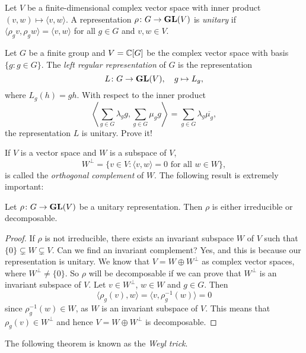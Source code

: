 \begin{definition}
    Let $V$ be a finite-dimensional complex vector space with inner product $(v,w)\mapsto\langle v,w\rangle$. 
    A representation $\rho\colon G\to\mathbf{GL}(V)$ is \emph{unitary} if
    $\langle \rho_gv,\rho_gw\rangle=\langle v,w\rangle$ for all $g\in G$ and $v,w\in V$.
\end{definition}

\begin{exercise}
Let $G$ be a finite group and $V=\mathbb{C}[G]$ be the complex vector space with basis
$\{g:g\in G\}$. The \emph{left regular representation}
of $G$ is the representation
\[
L\colon G\to\mathbf{GL}(V),
\quad
g\mapsto L_g,
\]
where $L_g(h)=gh$. With respect to the inner product
\[
\left\langle\sum_{g\in G}\lambda_gg,\sum_{g\in G}\mu_gg\right\rangle=\sum_{g\in G}\lambda_g\overline{\mu_g},
\]
the representation $L$ is unitary. Prove it! 
\end{exercise}



If $V$ is a vector space and $W$ is a subspace of $V$, 
\[
W^\perp = \{v\in V:\langle v,w\rangle=0\text{ for all $w\in W$}\}, 
\]
is called the 
\emph{orthogonal complement} of $W$. The following result is extremely important: 

\begin{proposition}
\label{pro:irr_or_dec}
Let $\rho\colon G\to\mathbf{GL}(V)$ be a unitary representation. Then $\rho$ is either
irreducible or decomposable.
\end{proposition}

\begin{proof}
	If $\rho$ is not irreducible, there exists an invariant subspace $W$ of $V$ such that
	$\{0\}\subsetneq W\subsetneq V$. Can we find an invariant complement? Yes, and this is because 
        our representation is unitary.  
	We know that $V=W\oplus W^{\perp}$ as complex vector spaces, where 
	$W^\perp\ne\{0\}$. So $\rho$ will be decomposable if we can prove that
	$W^\perp$ is an invariant subspace of $V$. 
	Let $v\in W^\perp$, $w\in W$ and $g\in G$. Then  
	\[
	\langle \rho_g(v),w\rangle=\langle v,\rho_g^{-1}(w)\rangle=0   
	\]
	since $\rho_g^{-1}(w)\in W$, as $W$ is an invariant subspace of $V$. This means that 
	$\rho_g(v)\in W^\perp$ and hence $V=W\oplus W^{\perp}$ is decomposable.  
\end{proof}

The following theorem is known as the \emph{Weyl trick}. 


